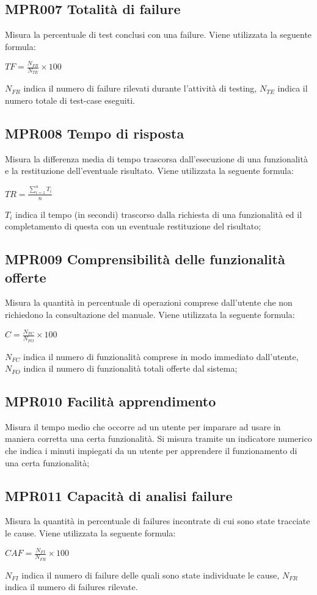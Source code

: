 \subsection{MPR007 Totalità di failure}
Misura la percentuale di test conclusi con una failure. Viene utilizzata la seguente formula:
\begin{center}{$TF=\frac{N_{FR}}{N_{TE}}\times 100$}\end{center}
${N_{FR}}$ indica il numero di failure rilevati durante l'attività di testing,
${N_{TE}}$ indica il numero totale di test-case eseguiti.

\subsection{MPR008 Tempo di risposta}
Misura la differenza media di tempo trascorsa dall’esecuzione di una funzionalità e la restituzione
dell’eventuale risultato. Viene utilizzata la seguente formula:
\begin{center}{$TR=\frac{\sum\limits_{i=1}^n {T_i }}{n}$}\end{center}
${T_i}$ indica il tempo (in secondi) trascorso dalla richiesta di una funzionalità ed il completamento di questa con un eventuale restituzione del risultato;\\

\subsection{MPR009 Comprensibilità  delle funzionalità offerte}
Misura la quantità in percentuale di operazioni comprese dall’utente che non richiedono la
consultazione del manuale. Viene utilizzata la seguente formula:
\begin{center}{$C=\frac{N_{FC}}{N_{FO}}\times 100$}\end{center}
${N_{FC}}$ indica il numero di funzionalità comprese in modo immediato dall'utente, ${N_{FO}}$ indica il numero di funzionalità totali offerte dal sistema;
	
\subsection{MPR010 Facilità apprendimento}
Misura il tempo medio che occorre ad un utente per imparare ad usare in maniera corretta
una certa funzionalità. Si misura tramite un indicatore numerico che indica i minuti
impiegati da un utente per apprendere il funzionamento di una certa funzionalità;

\subsection{MPR011 Capacità di analisi failure}
Misura la quantità in percentuale di failures incontrate di cui sono state tracciate le cause. Viene
utilizzata la seguente formula:
\begin{center}{$CAF=\frac{N_{FI}}{N_{FR}}\times 100 $}\end{center}
${N_{FI}}$ indica il numero di failure delle quali sono state individuate le cause, ${N_{FR}}$ indica il numero di failures rilevate.

